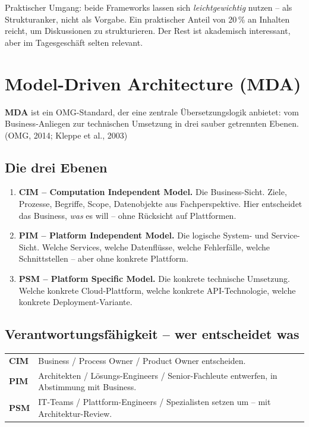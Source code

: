 \documentclass[11pt,a4paper,oneside]{article}
\newcommand{\fachbegriff}[1]{\textbf{#1}}
\newcommand{\quelle}[1]{{\footnotesize\color{lpGray}(#1)}}
\begin{document}
Praktischer Umgang: beide Frameworks lassen sich \emph{leichtgewichtig} nutzen -- als Strukturanker, nicht als Vorgabe. Ein praktischer Anteil von 20\,\% an Inhalten reicht, um Diskussionen zu strukturieren. Der Rest ist akademisch interessant, aber im Tagesgeschäft selten relevant.

\section{Model-Driven Architecture (MDA)}

\fachbegriff{MDA} ist ein OMG-Standard, der eine zentrale Übersetzungslogik anbietet: vom Business-Anliegen zur technischen Umsetzung in drei sauber getrennten Ebenen. \quelle{OMG, 2014; Kleppe et al., 2003}

\subsection{Die drei Ebenen}

\begin{enumerate}
  \item \fachbegriff{CIM -- Computation Independent Model.} Die Business-Sicht. Ziele, Prozesse, Begriffe, Scope, Datenobjekte aus Fachperspektive. Hier entscheidet das Business, \emph{was} es will -- ohne Rücksicht auf Plattformen.
  \item \fachbegriff{PIM -- Platform Independent Model.} Die logische System- und Service-Sicht. Welche Services, welche Datenflüsse, welche Fehlerfälle, welche Schnittstellen -- aber ohne konkrete Plattform.
  \item \fachbegriff{PSM -- Platform Specific Model.} Die konkrete technische Umsetzung. Welche konkrete Cloud-Plattform, welche konkrete API-Technologie, welche konkrete Deployment-Variante.
\end{enumerate}

\subsection{Verantwortungsfähigkeit -- wer entscheidet was}

\begin{tabularx}{\linewidth}{@{}lX@{}}
\toprule
\textbf{CIM} & Business / Process Owner / Product Owner entscheiden. \\
\textbf{PIM} & Architekten / Lösungs-Engineers / Senior-Fachleute entwerfen, in Abstimmung mit Business. \\
\textbf{PSM} & IT-Teams / Plattform-Engineers / Spezialisten setzen um -- mit Architektur-Review. \\
\bottomrule
\end{tabularx}
\end{document}
